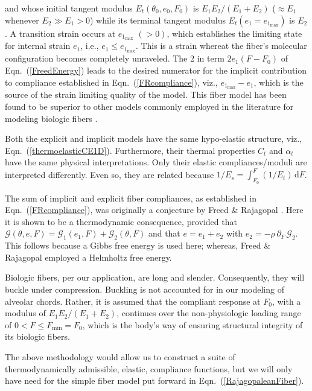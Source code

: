 and whose initial tangent modulus $E_t(\theta_0, e_0, F_0)$ is $E_1 E_2 / (E_1 + E_2)$ ($\approx E_1$ whenever $E_2 \gg E_1 > 0$) while its terminal tangent modulus $E_t(e_1 \! = \! e_{1_{\max}})$ is $E_2$.  A transition strain occurs at $e_{1_{\max}}$ $(> 0)$, which establishes the limiting state for internal strain $e_1$, i.e., $e_1 \leq e_{1_{\max}}$.  This is a strain whereat the fiber's molecular configuration becomes completely unraveled.  The 2 in term $2 e_1 (F - F_0)$ of Eqn.~(\ref{FreedEnergy}) leads to the desired numerator for the implicit contribution to compliance established in Eqn.~(\ref{FRcompliance}), viz., $e_{1_{\max}} - e_1$, which is the source of the strain limiting quality of the model.  This fiber model has been found to be superior to other models commonly employed in the literature for modeling biologic fibers \cite{AkintundeMiller18,Robbinsetal20}.

Both the explicit and implicit models have the same hypo-elastic structure, viz., Eqn.~(\ref{thermoelasticCE1D}).  Furthermore, their thermal properties $C_t$ and $\alpha_t$ have the same physical interpretations. Only their elastic compliances\slash moduli are interpreted differently.  Even so, they are related because $1/E_s = \int_{F_0}^F (1/E_t) \, \mathrm{d}F$.

The sum of implicit and explicit fiber compliances, as established in Eqn.~(\ref{FRcompliance}), was originally a conjecture by Freed \& Rajagopal \cite{FreedRajagopal16}.  Here it is shown to be a thermo\-dynamic consequence, provided that $\mathcal{G} ( \theta , e , F) = \mathcal{G}_1 ( e_1 , F ) + \mathcal{G}_2 ( \theta , F )$ and that $e = e_1 + e_2$ with $e_2 = - \rho \, \partial_{F\,} \mathcal{G}_2$.  This follows because a Gibbs free energy is used here; whereas, Freed \& Rajagopal employed a Helmholtz free energy.

Biologic fibers, per our application, are long and slender.  Consequently, they will buckle under compression.  Buckling is not accounted for in our modeling of alveolar chords.  Rather, it is assumed that the compliant response at $F_0$, with a modulus of $E_1 E_2 / ( E_1 + E_2 )$, continues over the non-physiologic loading range of $0 < F \leq F_{\min} = F_0$, which is the body's way of ensuring structural integrity of its biologic fibers.

The above methodology would allow us to construct a suite of thermo\-dynamically admissible, elastic, compliance functions, but we will only have need for the simple fiber model put forward in Eqn.~(\ref{RajagopaleanFiber}).

